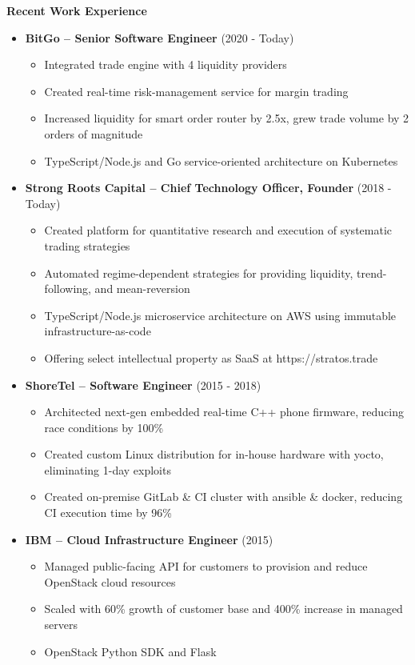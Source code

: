 \documentclass{report}
\begin{document}
\textbf{Recent Work Experience}
\begin{itemize}[label=$\cdot$]

\item \textbf{BitGo -- Senior Software Engineer} (2020 - Today)
  \begin{itemize}[label=$\circ$]
  \item Integrated trade engine with 4 liquidity providers
  \item Created real-time risk-management service for margin trading
  \item Increased liquidity for smart order router by 2.5x, grew trade volume by 2 orders of magnitude
  \item TypeScript/Node.js and Go service-oriented architecture on Kubernetes
  \end{itemize}

\item \textbf{Strong Roots Capital -- Chief Technology Officer, Founder} (2018 - Today)
  \begin{itemize}[label=$\circ$]
  \item Created platform for quantitative research and execution of systematic trading strategies
  \item Automated regime-dependent strategies for providing liquidity, trend-following, and mean-reversion
  \item TypeScript/Node.js microservice architecture on AWS using immutable infrastructure-as-code
  \item Offering select intellectual property as SaaS at https://stratos.trade
  \end{itemize}

\item \textbf{ShoreTel -- Software Engineer} (2015 - 2018)
  \begin{itemize}[label=$\circ$]
  \item Architected next-gen embedded real-time C++ phone firmware, reducing race conditions by 100\%
  \item Created custom Linux distribution for in-house hardware with yocto, eliminating 1-day exploits
  \item Created on-premise GitLab \& CI cluster with ansible \& docker, reducing CI execution time by 96\%
  \end{itemize}

\item \textbf{IBM -- Cloud Infrastructure Engineer} (2015)
  \begin{itemize}[label=$\circ$]
  \item Managed public-facing API for customers to provision and reduce OpenStack cloud resources
  \item Scaled with 60\% growth of customer base and 400\% increase in managed servers
  \item OpenStack Python SDK and Flask
  \end{itemize}


\end{itemize}
\end{document}
